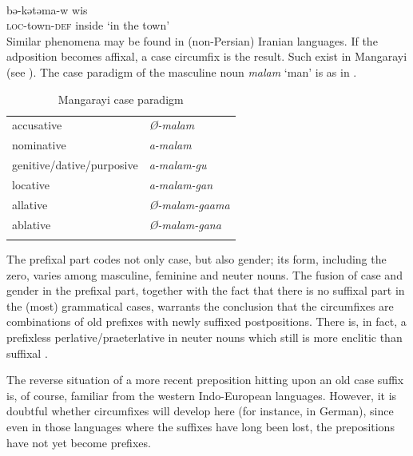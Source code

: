 \ea\label{ex:E75}
\langinfo{\LangAmh}{}{} \\
\gll   bə-kətəma-w  wis  \\
\textsc{loc}-town-\textsc{def}  inside  ‘in the town’\\
\z
\noindent Similar phenomena may be found in (non-Persian) Iranian languages. If the adposition becomes affixal, a case circumfix is the result. Such exist in Mangarayi (see \citealt[57--59]{Merlan1982}). The case paradigm of the masculine noun \textit{malam} ‘man’ is as in .

\begin{table}
\begin{tabular}{ll}
\lsptoprule
accusative & \itshape Ø-malam\\
nominative & \itshape a-malam\\
genitive/dative/purposive & \itshape a-malam-gu\\
locative & \itshape a-malam-gan\\
allative & \itshape Ø-malam-gaama\\
ablative & \itshape Ø-malam-gana\\
\lspbottomrule
\end{tabular}
\caption{Mangarayi case paradigm}\label{tab:Mangarayi}
\end{table}

The prefixal part codes not only case, but also gender; its form, including the zero, varies among masculine, feminine and neuter nouns. The fusion of case and gender in the prefixal part, together with the fact that there is no suffixal part in the (most) grammatical cases, warrants the conclusion that the circumfixes are combinations of old prefixes with newly suffixed postpositions. There is, in fact, a prefixless perlative/praeterlative in neuter nouns which still is more enclitic than suffixal \citep[59]{Merlan1982}.

The reverse situation of a more recent preposition hitting upon an old case suffix is, of course, familiar from the western Indo-European languages. However, it is doubtful whether circumfixes will develop here (for instance, in German), since even in those languages where the suffixes have long been lost, the prepositions have not yet become prefixes.

